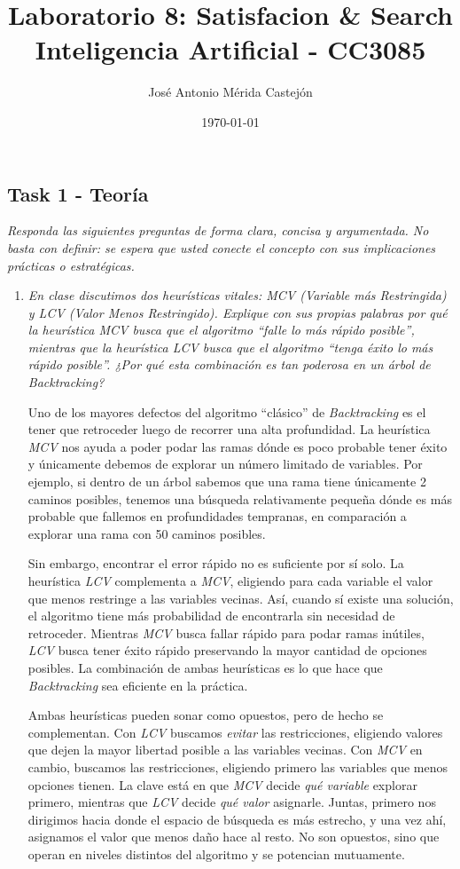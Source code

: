 \documentclass[11pt]{article}
\title{\textbf{Laboratorio 8: Satisfacion \& Search} \vspace{1em}\\
  Inteligencia Artificial - CC3085}
\author{José Antonio Mérida Castejón}
\date{\today}
\begin{document}
\maketitle

\subsection*{Task 1 - Teoría}
\textit{Responda las siguientes preguntas de forma clara, concisa y argumentada. No basta con
definir: se espera que usted conecte el concepto con sus implicaciones prácticas o estratégicas.}

\begin{enumerate}

  \item \textit{En clase discutimos dos heurísticas vitales: MCV (Variable más Restringida) y LCV
    (Valor Menos Restringido). Explique con sus propias palabras por qué la heurística MCV busca
    que el algoritmo ``falle lo más rápido posible'', mientras que la heurística LCV busca que el
    algoritmo ``tenga éxito lo más rápido posible''. ¿Por qué esta combinación es tan poderosa en
    un árbol de Backtracking?}

  \vspace{0.5em}

  Uno de los mayores defectos del algoritmo ``clásico'' de \textit{Backtracking} es el tener que
  retroceder luego de recorrer una alta profundidad. La heurística \textit{MCV} nos ayuda a poder
  podar las ramas dónde es poco probable tener éxito y únicamente debemos de explorar un número
  limitado de variables. Por ejemplo, si dentro de un árbol sabemos que una rama tiene únicamente
  2 caminos posibles, tenemos una búsqueda relativamente pequeña dónde es más probable que fallemos
  en profundidades tempranas, en comparación a explorar una rama con 50 caminos posibles.

  Sin embargo, encontrar el error rápido no es suficiente por sí solo. La heurística \textit{LCV}
  complementa a \textit{MCV}, eligiendo para cada variable el valor que menos restringe a las
  variables vecinas. Así, cuando sí existe una solución, el algoritmo tiene más probabilidad de
  encontrarla sin necesidad de retroceder. Mientras \textit{MCV} busca fallar rápido para podar
  ramas inútiles, \textit{LCV} busca tener éxito rápido preservando la mayor cantidad de opciones
  posibles. La combinación de ambas heurísticas es lo que hace que \textit{Backtracking} sea
  eficiente en la práctica.

  Ambas heurísticas pueden sonar como opuestos, pero de hecho se complementan. Con \textit{LCV}
  buscamos \textit{evitar} las restricciones, eligiendo valores que dejen la mayor libertad posible
  a las variables vecinas. Con \textit{MCV} en cambio, buscamos las restricciones, eligiendo
  primero las variables que menos opciones tienen. La clave está en que \textit{MCV} decide
  \textit{qué variable} explorar primero, mientras que \textit{LCV} decide \textit{qué valor}
  asignarle. Juntas, primero nos dirigimos hacia donde el espacio de búsqueda es más estrecho, y
  una vez ahí, asignamos el valor que menos daño hace al resto. No son opuestos, sino que operan
  en niveles distintos del algoritmo y se potencian mutuamente.


\end{enumerate}
\end{document}
